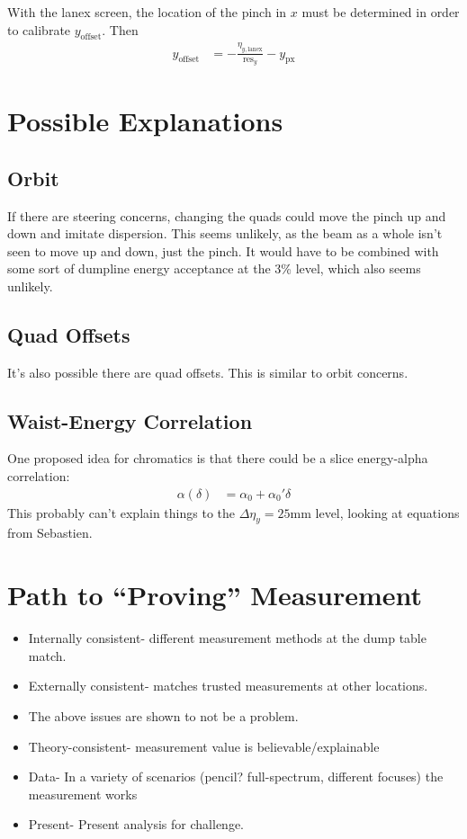 \documentclass[aps,prl,twocolumn,groupedaddress]{revtex4}
\begin{document}
With the lanex screen, the location of the pinch in $x$ must be determined in order to calibrate $y_\text{offset}$.  Then
\begin{align}
	y_\text{offset} &= -\frac{\eta_{y,\text{lanex}}}{\text{res}_y} - y_\text{px}
	\label{}
\end{align}



\section{Possible Explanations}

\subsection{Orbit}

If there are steering concerns, changing the quads could move the pinch up and down and imitate dispersion.  This seems unlikely, as the beam as a whole isn't seen to move up and down, just the pinch.  It would have to be combined with some sort of dumpline energy acceptance at the 3\% level, which also seems unlikely.

\subsection{Quad Offsets}

It's also possible there are quad offsets.  This is similar to orbit concerns.

\subsection{Waist-Energy Correlation}

One proposed idea for chromatics is that there could be a slice energy-alpha correlation:
\begin{align}
	\alpha(\delta) &= \alpha_0 + \alpha_0' \delta
	\label{Eq:chromaticalpha}
\end{align}
This probably can't explain things to the $\Delta\eta_y=25$mm level, looking at equations from Sebastien.

\section{Path to ``Proving'' Measurement}

\begin{itemize}
	\item Internally consistent- different measurement methods at the dump table match.
	\item Externally consistent- matches trusted measurements at other locations.
	\item The above issues are shown to not be a problem.
	\item Theory-consistent- measurement value is believable/explainable
	\item Data- In a variety of scenarios (pencil? full-spectrum, different focuses) the measurement works
	\item Present- Present analysis for challenge.
\end{itemize}




% 
\end{document}
